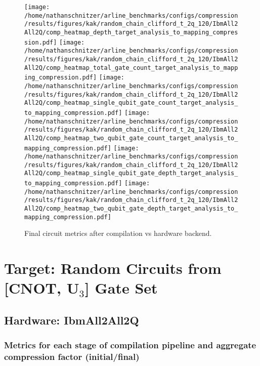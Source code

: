 \documentclass{report}%
\begin{document}
\begin{figure}[h!]%
\centering%
\texttt{[image: /home/nathanschnitzer/arline\_benchmarks/configs/compression/results/figures/kak/random\_chain\_clifford\_t\_2q\_120/IbmAll2All2Q/comp\_heatmap\_depth\_target\_analysis\_to\_mapping\_compression.pdf]}%
\centering%
\texttt{[image: /home/nathanschnitzer/arline\_benchmarks/configs/compression/results/figures/kak/random\_chain\_clifford\_t\_2q\_120/IbmAll2All2Q/comp\_heatmap\_total\_gate\_count\_target\_analysis\_to\_mapping\_compression.pdf]}%
\linebreak%
\centering%
\texttt{[image: /home/nathanschnitzer/arline\_benchmarks/configs/compression/results/figures/kak/random\_chain\_clifford\_t\_2q\_120/IbmAll2All2Q/comp\_heatmap\_single\_qubit\_gate\_count\_target\_analysis\_to\_mapping\_compression.pdf]}%
\centering%
\texttt{[image: /home/nathanschnitzer/arline\_benchmarks/configs/compression/results/figures/kak/random\_chain\_clifford\_t\_2q\_120/IbmAll2All2Q/comp\_heatmap\_two\_qubit\_gate\_count\_target\_analysis\_to\_mapping\_compression.pdf]}%
\linebreak%
\centering%
\texttt{[image: /home/nathanschnitzer/arline\_benchmarks/configs/compression/results/figures/kak/random\_chain\_clifford\_t\_2q\_120/IbmAll2All2Q/comp\_heatmap\_single\_qubit\_gate\_depth\_target\_analysis\_to\_mapping\_compression.pdf]}%
\centering%
\texttt{[image: /home/nathanschnitzer/arline\_benchmarks/configs/compression/results/figures/kak/random\_chain\_clifford\_t\_2q\_120/IbmAll2All2Q/comp\_heatmap\_two\_qubit\_gate\_depth\_target\_analysis\_to\_mapping\_compression.pdf]}%
\linebreak%
\caption{Final circuit metrics after compilation vs hardware backend.}%
\end{figure}

%
\chapter{Target: Random Circuits from [CNOT, U$_3$] Gate Set}%
\label{chap:TargetRandomCircuitsfromCNOT,U3GateSet}%
\section{Hardware: IbmAll2All2Q}%
\label{sec:HardwareIbmAll2All2Q}%

%
\subsection*{Metrics for each stage of compilation pipeline and aggregate compression factor
                    (initial/final)}%
\label{subsec:Metricsforeachstageofcompilationpipelineandaggregatecompressionfactor(initial/final)}%
\end{document}
